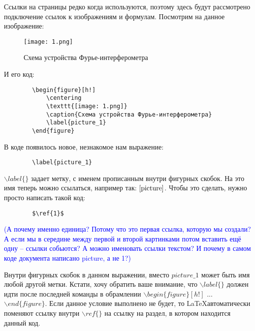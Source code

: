    Ссылки на страницы редко когда используются, поэтому здесь будут рассмотрено подключение ссылок к изображениям и формулам. Посмотрим на данное изображение:

    \newpage    
    
    \begin{figure}[h!]
        \centering
        \texttt{[image: 1.png]}
        \caption{Схема устройства Фурье-интерферометра}
        \label{picture}
    \end{figure}
    
    И его код:
    
    \begin{verbatim}
        \begin{figure}[h!]
            \centering
            \texttt{[image: 1.png]}
            \caption{Схема устройства Фурье-интерферометра}
            \label{picture_1}
        \end{figure}
    \end{verbatim}
    
    В коде появилось новое, незнакомое нам выражение: 

    \begin{verbatim}
        \label{picture_1}    
    \end{verbatim}

    $\backslash label\{\}$ задает метку, 
    с именем прописанным внутри фигурных скобок. На это имя теперь можно ссылаться, например так: $\ref{picture}$. Чтобы это сделать, нужно просто написать такой код:
    
    \begin{verbatim}
        $\ref{1}$
    \end{verbatim}
    
    \textcolor{Blue}{(А почему именно единица? Потому что это первая ссылка, которую мы создали? А если мы в середине между первой и второй картинками потом вставить ещё одну -- ссылки собьются? А можно именовать ссылки текстом? И почему в самом коде документа написано picture, а не 1?)}

    Внутри фигурных скобок в данном выражении, вместо $picture\_1$ может быть имя любой другой метки. Кстати, хочу обратить ваше внимание, что $\backslash label\{\}$ должен идти после последней команды в обрамлении $\backslash begin\{figure\}[h!]$ ... $\backslash end\{figure\}$. Если данное условие выполнено не будет, то \LaTeX автоматически поменяют ссылку внутри $\backslash ref\{\}$ на ссылку на раздел, в котором находится данный код.
    
